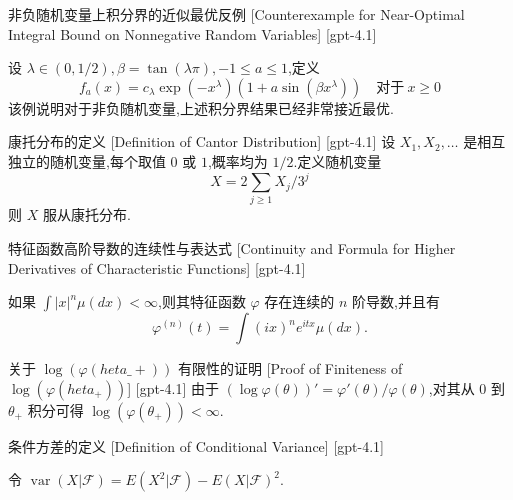 \documentclass[UTF8]{ctexart}
\begin{document}
    
    
    \begin{cxmp}
        {非负随机变量上积分界的近似最优反例}
        [Counterexample for Near-Optimal Integral Bound on Nonnegative Random Variables]
        [gpt-4.1]
        
设 $\lambda \in ( 0 , 1 / 2 ), \beta = \tan ( \lambda \pi ), -1 \leq a \leq 1$,定义
\[
f_{a}(x) = c_{\lambda} \exp(-x^{\lambda}) (1 + a \sin(\beta x^{\lambda})) \quad \text{对于}~ x \geq 0
\]
该例说明对于非负随机变量,上述积分界结果已经非常接近最优.

    \end{cxmp}
    
    
    
    \begin{dfn}
        {康托分布的定义}
        [Definition of Cantor Distribution]
        [gpt-4.1]
        设 $X_1, X_2, \dots$ 是相互独立的随机变量,每个取值 $0$ 或 $1$,概率均为 $1/2$.定义随机变量
\[
X = 2 \sum_{j \geq 1} X_j / 3^j
\]
则 $X$ 服从康托分布.
    \end{dfn}
    
    
    
    \begin{thm}
        {特征函数高阶导数的连续性与表达式}
        [Continuity and Formula for Higher Derivatives of Characteristic Functions]
        [gpt-4.1]
        
如果 $\int |x|^n \mu(dx) < \infty$,则其特征函数 $\varphi$ 存在连续的 $n$ 阶导数,并且有
\[
\varphi^{(n)}(t) = \int (ix)^n e^{itx} \mu(dx).
\]

    \end{thm}
    
    
    
    \begin{prf}
        {关于 $\log(\varphi(	heta\_+))$ 有限性的证明}
        [Proof of Finiteness of $\log(\varphi(	heta_+))$]
        [gpt-4.1]
        由于 $(\log \varphi(\theta))' = \varphi'(\theta)/\varphi(\theta)$,对其从 $0$ 到 $\theta_+$ 积分可得 $\log(\varphi(\theta_+)) < \infty$.
    \end{prf}
    
    
    
    \begin{dfn}
        {条件方差的定义}
        [Definition of Conditional Variance]
        [gpt-4.1]
        
令 $\operatorname{var} ( X | \mathcal F ) = E ( X ^ { 2 } | \mathcal F ) - E ( X | \mathcal F ) ^ { 2 }$.

    \end{dfn}
    
\end{document}
